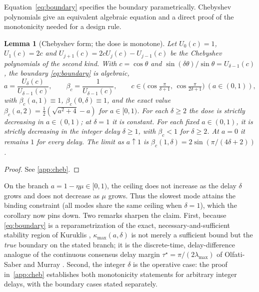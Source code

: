 \documentclass[11pt]{article}
\newtheorem{lemma}{Lemma}
\theoremstyle{definition}
\begin{document}
Equation~\eqref{eq:boundary} specifies the boundary parametrically. Chebyshev polynomials give
an equivalent algebraic equation and a direct proof of the monotonicity needed for a design rule.

\begin{lemma}[Chebyshev form; the dose is monotone]\label{lem:cheb}
Let $U_0(c)=1$, $U_1(c)=2c$ and $U_{j+1}(c)=2cU_j(c)-U_{j-1}(c)$ be the Chebyshev
polynomials of the second kind. With $c=\cos\theta$ and
$\sin(\delta\theta)/\sin\theta=U_{\delta-1}(c)$, the boundary \eqref{eq:boundary} is algebraic,
\[
  a=\frac{U_\delta(c)}{U_{\delta-1}(c)},\qquad \beta_c=\frac{1}{U_{\delta-1}(c)},
  \qquad c\in\Big(\cos\tfrac{\pi}{\delta+1},\,\cos\tfrac{\pi}{2\delta+1}\Big)\ (a\in(0,1)),
\]
with $\beta_c(a,1)\equiv1$, $\beta_c(0,\delta)\equiv1$, and the exact value
$\beta_c(a,2)=\tfrac12(\sqrt{a^2+4}-a)$ for $a\in[0,1)$. For each $\delta\ge2$ the dose is
strictly decreasing in $a\in(0,1)$; at $\delta=1$ it is constant. For each fixed $a\in(0,1)$,
it is strictly decreasing in the integer delay $\delta\ge1$, with $\beta_c<1$ for $\delta\ge2$.
At $a=0$ it remains $1$ for every delay. The limit as $a\uparrow1$ is
$\beta_c(1,\delta)=2\sin(\pi/(4\delta+2))$.
\end{lemma}
\begin{proof}
See \ref{app:cheb}.
\end{proof}

On the branch $a=1-\eta\mu\in[0,1)$,
the ceiling does not increase as the delay $\delta$ grows and does not decrease as $\mu$ grows. Thus the slowest
mode attains the binding constraint (all modes share the same ceiling when $\delta=1$),
which the corollary now pins down. Two remarks sharpen the claim. First, because \eqref{eq:boundary}
is a reparametrization of the exact, necessary-and-sufficient stability region of Kuruklis
\cite{Kuruklis}, $\kappa_{\max}(a,\delta)$ is not merely a sufficient bound but the \emph{true}
boundary on the stated branch; it is the discrete-time, delay-difference analogue of the continuous consensus delay margin
$\tau^\star=\pi/(2\lambda_{\max})$ of Olfati-Saber and Murray \cite{OlfatiSaber}. Second, the integer
$\delta$ is the operative case: the proof in~\ref{app:cheb} establishes both monotonicity statements for
arbitrary integer delays, with the boundary cases stated separately.
\end{document}
